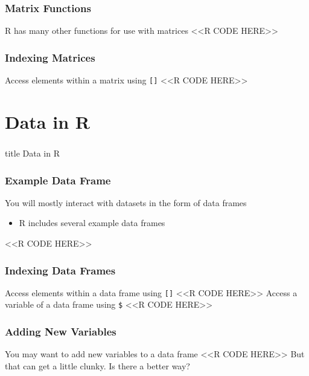 \documentclass{beamer}
\begin{document}
\begin{frame}[fragile]\frametitle{Matrix Functions}
    R has many other functions for use with matrices
    <<R CODE HERE>>
\end{frame}

\begin{frame}[fragile]\frametitle{Indexing Matrices}
    Access elements within a matrix using \texttt{[]}
    <<R CODE HERE>>
\end{frame}

\section{Data in R}
\label{data}
\begin{frame}\frametitle{}
    \vfill
    \centering
    \begin{beamercolorbox}[center]{title}
        \Large Data in R
    \end{beamercolorbox}
    \vfill
\end{frame}

\begin{frame}[fragile]\frametitle{Example Data Frame}
    You will mostly interact with datasets in the form of data frames
    \begin{itemize}
        \item R includes several example data frames
    \end{itemize}
    <<R CODE HERE>>
\end{frame}

\begin{frame}[fragile]\frametitle{Indexing Data Frames}
    Access elements within a data frame using \texttt{[]}
    <<R CODE HERE>>
    \vspace{2ex}
    Access a variable of a data frame using \texttt{\$}
    <<R CODE HERE>>
\end{frame}

\begin{frame}[fragile]\frametitle{Adding New Variables}
    You may want to add new variables to a data frame
    <<R CODE HERE>>
    But that can get a little clunky. Is there a better way?
\end{frame}
\end{document}
